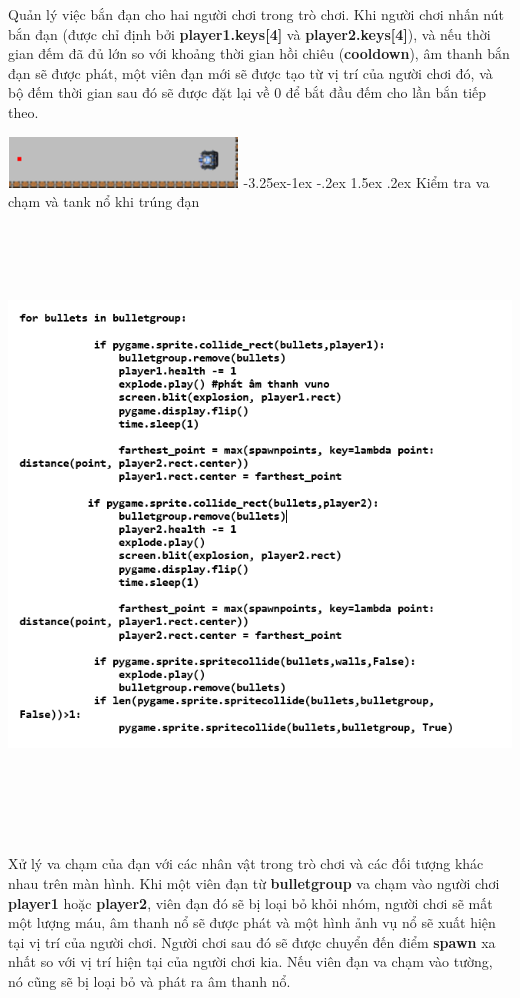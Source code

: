 \documentclass[a4paper]{article}
\makeatletter
\newcounter {subsubsubsection}[subsubsection]
\newcommand\subsubsubsection{\@startsection{subsubsubsection}{4}{\z@}%
                                     {-3.25ex\@plus -1ex \@minus -.2ex}%
                                     {1.5ex \@plus .2ex}%
                                     {\normalfont\normalsize\bfseries}}
\makeatother
\begin{document}
Quản lý việc bắn đạn cho hai người chơi trong trò chơi. Khi người chơi
nhấn nút bắn đạn (được chỉ định bởi \textbf{player1.keys{[}4{]}} và
\textbf{player2.keys{[}4{]}}), và nếu thời gian đếm đã đủ lớn so với
khoảng thời gian hồi chiêu (\textbf{cooldown}), âm thanh bắn đạn sẽ được
phát, một viên đạn mới sẽ được tạo từ vị trí của người chơi đó, và bộ
đếm thời gian sau đó sẽ được đặt lại về 0 để bắt đầu đếm cho lần bắn
tiếp theo.

\includegraphics[width=2.40556in,height=0.53194in]{image54.png}
\subsubsubsection{Kiểm tra va chạm và tank nổ khi trúng đạn}
\includegraphics[width=5.5in,height=6.5in]{image54_1.png}

Xử lý va chạm của đạn với các nhân vật trong trò chơi và các đối tượng
khác nhau trên màn hình. Khi một viên đạn từ \textbf{bulletgroup} va
chạm vào người chơi \textbf{player1} hoặc \textbf{player2}, viên đạn đó
sẽ bị loại bỏ khỏi nhóm, người chơi sẽ mất một lượng máu, âm thanh nổ sẽ
được phát và một hình ảnh vụ nổ sẽ xuất hiện tại vị trí của người chơi.
Người chơi sau đó sẽ được chuyển đến điểm \textbf{spawn} xa nhất so với
vị trí hiện tại của người chơi kia. Nếu viên đạn va chạm vào tường, nó
cũng sẽ bị loại bỏ và phát ra âm thanh nổ.
\end{document}
